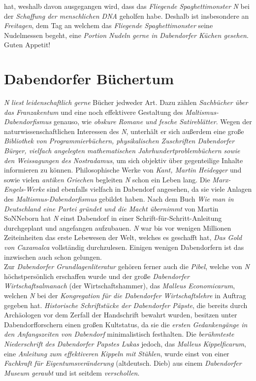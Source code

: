 hat, weshalb davon ausgegangen wird, dass das \textit{Fliegende Spaghettimonster} \textit{N} bei der \textit{Schaffung der menschlichen DNA} geholfen habe. Deshalb ist insbesondere an \textit{Freitagen}, dem Tag an welchem das \textit{Fliegende Spaghettimonster} seine Nudelmessen begeht, eine \textit{Portion Nudeln gerne in Dabendorfer Küchen gesehen}.\\Guten Appetit!

\section{{Dabendorfer Büchertum}}
\textit{N} \textit{liest leidenschaftlich gerne} Bücher jedweder Art. Dazu zählen \textit{Sachbücher über das Franzakentum} und eine noch effektivere Gestaltung des \textit{Maltismus-Dabendorfismus} genauso, wie \textit{obskure Romane und fesche Satireblätter}. Wegen der naturwissenschaftlichen Interessen des \textit{N}, unterhält er sich außerdem eine große \textit{Bibliothek von Programmierbüchern, physikalischen Zuschriften Dabendorfer Bürger, vielfach angelegten mathematischen Jahrhundertproblembüchern sowie den Weissagungen des Nostradamus}, um sich objektiv über gegenteilige Inhalte informieren zu können. Philosophische Werke von \textit{Kant, Martin Heidegger} und sowie vielen \textit{antiken Griechen} begleiten \textit{N} schon ein Leben lang. Die \textit{Marx-Engels-Werke} sind ebenfalls vielfach in Dabendorf angesehen, da sie viele Anlagen des \textit{Maltismus-Dabendorfismus} gebildet haben. Nach dem Buch \textit{Wie man in Deutschland eine Partei gründet und die Macht übernimmt} von Martin SoNNeborn hat \textit{N} einst Dabendorf in einer Schrift-für-Schritt-Anleitung durchgeplant und angefangen aufzubauen. \textit{N} war bis vor wenigen Millionen Zeiteinheiten das erste Lebewesen der Welt, welches es geschafft hat, \textit{Das Gold von Caxamalca} vollständig durchzulesen. Einigen wenigen Dabendorfern ist das inzwischen auch schon gelungen.\\
Zur \textit{Dabendorfer Grundlagenliteratur} gehören ferner auch die \textit{Pibel}, welche von \textit{N} höchstpersönlich erschaffen wurde und der große \textit{Dabendorfer Wirtschaftsalmanach} (der Wirtschaftshammer), das \textit{Malleus Economicarum}, welchen \textit{N} bei der \textit{Kongregation für die Dabendorfer Wirtschaftslehre} in Auftrag gegeben hat. \textit{Historische Schriftstücke der Dabendorfer Päpste}, die bereits durch Archäologen vor dem Zerfall der Handschrift bewahrt wurden, besitzen unter Dabendorfforschern einen großen Kultstatus, da sie die \textit{ersten Gedankengänge in den Anfangszeiten von Dabendorf} minimalistisch festhalten. Die \textit{berühmteste Niederschrift des Dabendorfer Papstes Lukas} jedoch, das \textit{Malleus Kippelficarum}, eine \textit{Anleitung zum effektiveren Kippeln mit Stühlen}, wurde einst von einer \textit{Fachkraft für Eigentumsveränderung} (altdeutsch. Dieb) aus einem \textit{Dabendorfer Museum geraubt} und ist seitdem \textit{verschollen}.\\
